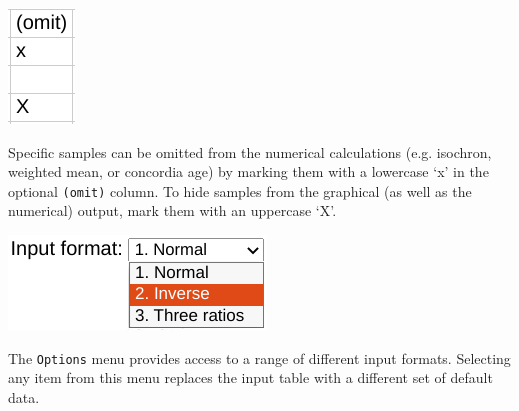 \begin{refsection}
\noindent\begin{minipage}[t]{.15\textwidth}
\strut\vspace*{-\baselineskip}\newline
\includegraphics[width=.55\textwidth]{../figures/omit.png}
\end{minipage}
\begin{minipage}[t]{.85\textwidth}
Specific samples can be omitted from the numerical calculations
(e.g. isochron, weighted mean, or concordia age) by marking them with
a lowercase `x' in the optional \texttt{(omit)} column. To hide
samples from the graphical (as well as the numerical) output, mark
them with an uppercase `X'.\\
\end{minipage}

\noindent\begin{minipage}[t]{.25\textwidth}
\strut\vspace*{-\baselineskip}\newline
\includegraphics[width=\textwidth]{../figures/formats.png}
\end{minipage}
\begin{minipage}[t]{.75\textwidth}
The \texttt{Options} menu provides access to a range of different
input formats. Selecting any item from this menu replaces the input
table with a different set of default data.\\
\end{minipage}


\end{refsection}
